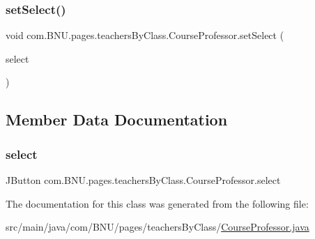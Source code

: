 \subsubsection{\texorpdfstring{set\+Select()}{setSelect()}}
{\footnotesize\ttfamily void com.\+B\+N\+U.\+pages.\+teachers\+By\+Class.\+Course\+Professor.\+set\+Select (\begin{DoxyParamCaption}\item[{J\+Button}]{select }\end{DoxyParamCaption})}



\subsection{Member Data Documentation}
\mbox{\label{classcom_1_1_b_n_u_1_1pages_1_1teachers_by_class_1_1_course_professor_a04debad4d0f70dd7ddbe956aa2c5347d}} 
\subsubsection{\texorpdfstring{select}{select}}
{\footnotesize\ttfamily J\+Button com.\+B\+N\+U.\+pages.\+teachers\+By\+Class.\+Course\+Professor.\+select}



The documentation for this class was generated from the following file\+:\begin{DoxyCompactItemize}
\item 
src/main/java/com/\+B\+N\+U/pages/teachers\+By\+Class/\mbox{\hyperlink{_course_professor_8java}{Course\+Professor.\+java}}\end{DoxyCompactItemize}
